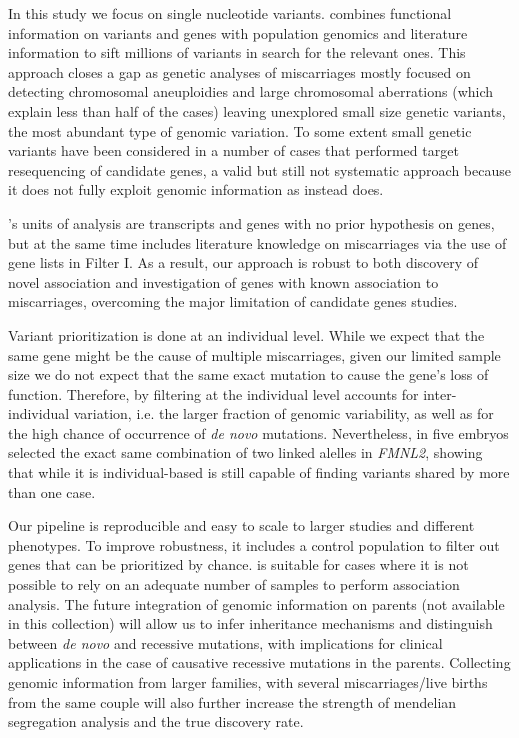 In this study we focus on single nucleotide variants. \gp combines functional information on variants and genes with population genomics and literature information to sift millions of variants in search for the relevant ones. This approach closes a gap as genetic analyses of miscarriages mostly focused on detecting chromosomal aneuploidies and large chromosomal aberrations (which explain less than half of the cases) leaving unexplored small size genetic variants, the most abundant type of genomic variation. To some extent small genetic variants have been considered in a number of cases that performed target resequencing of candidate genes, a valid but still not systematic approach because it does not fully exploit genomic information as instead \gp does.

\gp's units of analysis are transcripts and genes with no prior hypothesis on genes, but at the same time \gp includes literature knowledge on miscarriages via the use of gene lists in Filter I. As a result, our approach is robust to both discovery of novel association and investigation of genes with known association to miscarriages, overcoming the major limitation of candidate genes studies. 

Variant prioritization is done at an individual level. While we expect that the same gene might be the cause of multiple miscarriages, given our limited sample size we do not expect that the same exact mutation to cause the gene's loss of function. Therefore, by filtering at the individual level \gp accounts for inter-individual variation, i.e. the larger fraction of genomic variability, as well as for the high chance of occurrence of \textit{de novo} mutations. Nevertheless, in five embryos \gp selected the exact same combination of two linked alelles in \textit{FMNL2}, showing that while it is individual-based \gp is still capable of finding variants shared by more than one case. 


Our pipeline is reproducible and easy to scale to larger studies and different phenotypes. To improve robustness, it includes a control population to filter out genes that can be prioritized by chance. \gp is suitable for cases where it is not possible to rely on an adequate number of samples to perform association analysis. The future integration of genomic information on parents (not available in this collection) will allow us to infer inheritance mechanisms and distinguish between \textit{de novo} and recessive mutations, with implications for clinical applications in the case of causative recessive mutations in the parents. Collecting genomic information from larger families, with several miscarriages/live births from the same couple will also further increase the strength of mendelian segregation analysis and the true discovery rate.  %


